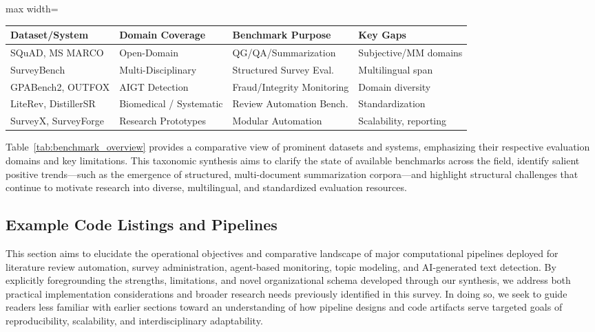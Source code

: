 \documentclass[sigconf]{acmart}
\begin{document}
\begin{table*}[htbp]
\centering
\caption{Overview of representative benchmark datasets and systems, highlighting domain focus, core evaluation roles, and current gaps.}
\label{tab:benchmark_overview}
\begin{adjustbox}{max width=\textwidth}
\begin{tabular}{@{}llll@{}}
\toprule
\textbf{Dataset/System} & \textbf{Domain Coverage} & \textbf{Benchmark Purpose} & \textbf{Key Gaps} \\
\midrule
SQuAD, MS MARCO        & Open-Domain              & QG/QA/Summarization        & Subjective/MM domains \\
SurveyBench            & Multi-Disciplinary       & Structured Survey Eval.    & Multilingual span     \\
GPABench2, OUTFOX      & AIGT Detection           & Fraud/Integrity Monitoring & Domain diversity      \\
LiteRev, DistillerSR   & Biomedical / Systematic  & Review Automation Bench.   & Standardization       \\
SurveyX, SurveyForge   & Research Prototypes      & Modular Automation         & Scalability, reporting\\
\bottomrule
\end{tabular}
\end{adjustbox}
\end{table*}

Table~\ref{tab:benchmark_overview} provides a comparative view of prominent datasets and systems, emphasizing their respective evaluation domains and key limitations. This taxonomic synthesis aims to clarify the state of available benchmarks across the field, identify salient positive trends---such as the emergence of structured, multi-document summarization corpora---and highlight structural challenges that continue to motivate research into diverse, multilingual, and standardized evaluation resources.

\subsection{Example Code Listings and Pipelines}

This section aims to elucidate the operational objectives and comparative landscape of major computational pipelines deployed for literature review automation, survey administration, agent-based monitoring, topic modeling, and AI-generated text detection. By explicitly foregrounding the strengths, limitations, and novel organizational schema developed through our synthesis, we address both practical implementation considerations and broader research needs previously identified in this survey. In doing so, we seek to guide readers less familiar with earlier sections toward an understanding of how pipeline designs and code artifacts serve targeted goals of reproducibility, scalability, and interdisciplinary adaptability.
\end{document}
